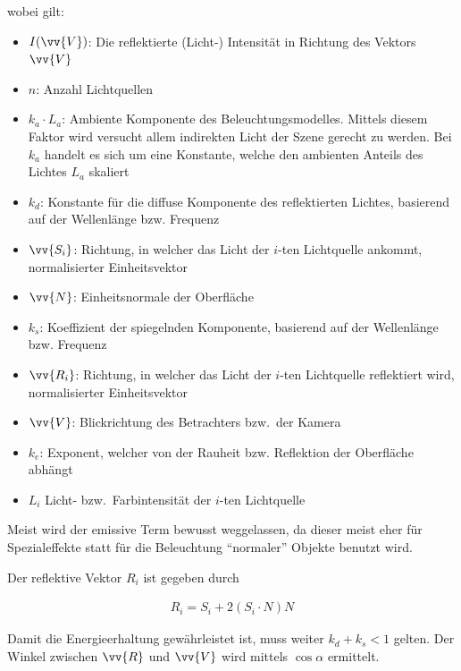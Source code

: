 wobei gilt:

\begin{itemize}
    \item $I(\vv{V})$:
        Die reflektierte (Licht-) Intensität in Richtung des Vektors
        $\vv{V}$

    \item $n$:
        Anzahl Lichtquellen

    \item $k_{a} \cdot L_{a}$:
        Ambiente Komponente des Beleuchtungsmodelles. Mittels diesem
        Faktor wird versucht allem indirekten Licht der Szene gerecht zu
        werden. Bei $k_{a}$ handelt es sich um eine Konstante, welche
        den ambienten Anteils des Lichtes $L_{a}$ skaliert

    \item $k_{d}$:
        Konstante für die diffuse Komponente des reflektierten Lichtes,
        basierend auf der Wellenlänge bzw. Frequenz

    \item $\vv{S_{i}}$:
        Richtung, in welcher das Licht der $i$-ten Lichtquelle ankommt,
        normalisierter Einheitsvektor

    \item $\vv{N}$:
        Einheitsnormale der Oberfläche

    \item $k_{s}$:
        Koeffizient der spiegelnden Komponente, basierend auf der
        Wellenlänge bzw. Frequenz

    \item $\vv{R_{i}}$:
        Richtung, in welcher das Licht der $i$-ten Lichtquelle
        reflektiert wird, normalisierter Einheitsvektor

    \item $\vv{V}$:
        Blickrichtung des Betrachters bzw.\ der Kamera

    \item $k_{e}$:
        Exponent, welcher von der Rauheit
        bzw.  Reflektion der Oberfläche abhängt \item $L_{i}$
        Licht- bzw.\ Farbintensität der $i$-ten Lichtquelle
\end{itemize}

Meist wird der emissive Term bewusst weggelassen, da dieser meist eher für
Spezialeffekte statt für die Beleuchtung ``normaler'' Objekte benutzt wird.

Der reflektive Vektor $R_{i}$ ist gegeben durch

\begin{gather}
    R_{i} = S_{i} + 2(S_{i} \cdot N)N
\end{gather}

Damit die Energieerhaltung gewährleistet ist, muss weiter $k_{d} + k_{s} < 1$
gelten. Der Winkel zwischen $\vv{R}$ und $\vv{V}$ wird mittels $\cos{\alpha}$
ermittelt.
